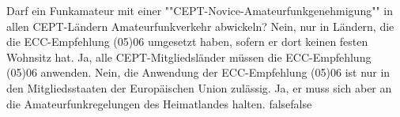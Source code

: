     {Darf ein Funkamateur mit einer ""CEPT-Novice-Amateurfunkgenehmigung"" in allen CEPT-Ländern Amateurfunkverkehr abwickeln?}
    {Nein, nur in Ländern, die die ECC-Empfehlung (05)06 umgesetzt haben, sofern er dort keinen festen Wohnsitz hat.}
    {Ja, alle CEPT-Mitgliedsländer müssen die ECC-Empfehlung (05)06 anwenden.}
    {Nein, die Anwendung der ECC-Empfehlung (05)06 ist nur in den Mitgliedsstaaten der Europäischen Union zulässig.}
    {Ja, er muss sich aber an die Amateurfunkregelungen des Heimatlandes halten.}
    {false}{false}